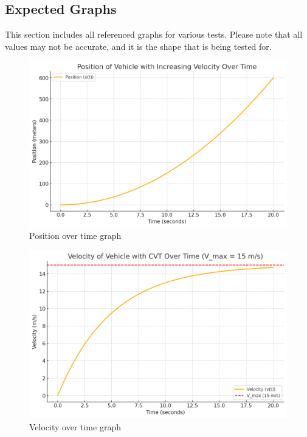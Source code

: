 \documentclass[12pt, titlepage]{article}
\begin{document}

\subsection{Expected Graphs}
This section includes all referenced graphs for various tests. Please note that all values may not be accurate, and it is the shape that is being tested for.

\begin{figure}[H]
  \centering
  \includegraphics[width=\textwidth]{graphs/position.png}
  \caption{Position over time graph}
  \label{fig:position_graph}
\end{figure}

\begin{figure}[H]
  \centering
  \includegraphics[width=\textwidth]{graphs/velocity.png}
  \caption{Velocity over time graph}
  \label{fig:velocity_graph}
\end{figure}
\end{document}
